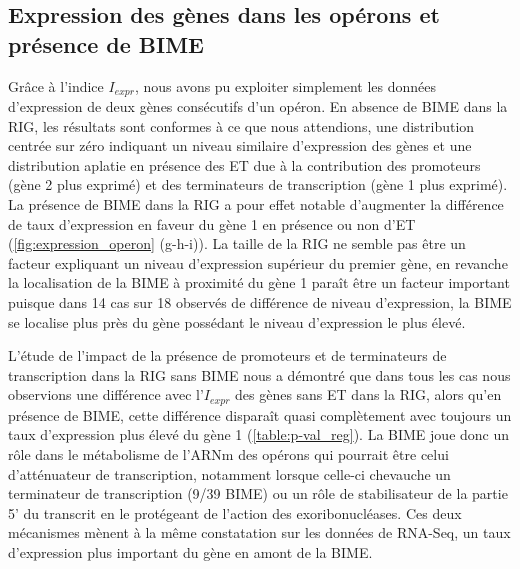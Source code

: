 \documentclass[12pt,a4paper]{report}
\begin{document}
\begin{onehalfspace}
\section*{Expression des gènes dans les opérons et présence de BIME}

Grâce à l'indice $I_{expr}$, nous avons pu exploiter simplement les données d'expression de deux gènes consécutifs d'un opéron. En absence de BIME dans la RIG, les résultats sont conformes à ce que nous attendions, une distribution centrée sur zéro indiquant un niveau similaire d'expression des gènes et une distribution aplatie en présence des ET due à la contribution des promoteurs (gène 2 plus exprimé) et des terminateurs de transcription (gène 1 plus exprimé). La présence de BIME dans la RIG a pour effet notable d'augmenter la différence de taux d'expression en faveur du gène 1 en présence ou non d'ET (\autoref{fig:expression_operon} (g-h-i)). La taille de la RIG ne semble pas être un facteur expliquant un niveau d'expression supérieur du premier gène, en revanche la localisation de la BIME à proximité du gène 1 paraît être un facteur important puisque dans 14 cas sur 18 observés de différence de niveau d'expression, la BIME se localise plus près du gène possédant le niveau d'expression le plus élevé.

L'étude de l'impact de la présence de promoteurs et de terminateurs de transcription dans la RIG sans BIME nous a démontré que dans tous les cas nous observions une différence avec l'$I_{expr}$ des gènes sans ET dans la RIG, alors qu'en présence de BIME, cette différence disparaît quasi complètement avec toujours un taux d'expression plus élevé du gène 1 (\autoref{table:p-val_reg}). La BIME joue donc un rôle dans le métabolisme de l'ARNm des opérons qui pourrait être celui d'atténuateur de transcription, notamment lorsque celle-ci chevauche un terminateur de transcription (9/39 BIME) ou un rôle de stabilisateur de la partie 5' du transcrit en le protégeant de l'action des exoribonucléases. Ces deux mécanismes mènent à la même constatation sur les données de RNA-Seq, un taux d'expression plus important du gène en amont de la BIME.


\end{onehalfspace}
\end{document}
